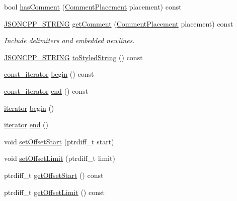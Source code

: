 \begin{DoxyCompactItemize}
bool \hyperlink{classJson_1_1Value_a06567a00363cab9601be7e31336db03a}{has\+Comment} (\hyperlink{namespaceJson_a4fc417c23905b2ae9e2c47d197a45351}{Comment\+Placement} placement) const 
\item 
\hyperlink{json_8hpp_a1e723f95759de062585bc4a8fd3fa4be}{J\+S\+O\+N\+C\+P\+P\+\_\+\+S\+T\+R\+I\+NG} \hyperlink{classJson_1_1Value_a5c3d0767cddbcba71a41bf52ead10525}{get\+Comment} (\hyperlink{namespaceJson_a4fc417c23905b2ae9e2c47d197a45351}{Comment\+Placement} placement) const 
\begin{DoxyCompactList}\small\item\em Include delimiters and embedded newlines. \end{DoxyCompactList}\item 
\hyperlink{json_8hpp_a1e723f95759de062585bc4a8fd3fa4be}{J\+S\+O\+N\+C\+P\+P\+\_\+\+S\+T\+R\+I\+NG} \hyperlink{classJson_1_1Value_a1b893476675b8f1c83f6f60a0938089b}{to\+Styled\+String} () const 
\item 
\hyperlink{classJson_1_1Value_af92282ca92b58b320debd486afb7696a}{const\+\_\+iterator} \hyperlink{classJson_1_1Value_ac12df0d6980600c5bac908ed0f64856e}{begin} () const 
\item 
\hyperlink{classJson_1_1Value_af92282ca92b58b320debd486afb7696a}{const\+\_\+iterator} \hyperlink{classJson_1_1Value_a596da1926b2f2a4056bff2edb713eb0b}{end} () const 
\item 
\hyperlink{classJson_1_1Value_a341cdf2e01f8b3c5b7317aa2f0768c53}{iterator} \hyperlink{classJson_1_1Value_a2d45bb2e68e8f22fe356d7d955ebd3c9}{begin} ()
\item 
\hyperlink{classJson_1_1Value_a341cdf2e01f8b3c5b7317aa2f0768c53}{iterator} \hyperlink{classJson_1_1Value_a2f961eff73f7f79cd29260b6cbd42558}{end} ()
\item 
void \hyperlink{classJson_1_1Value_a92e32ea0f4f8a15853a3cf0beac9feb9}{set\+Offset\+Start} (ptrdiff\+\_\+t start)
\item 
void \hyperlink{classJson_1_1Value_a5e4f5853fec138150c5df6004a8c2bcf}{set\+Offset\+Limit} (ptrdiff\+\_\+t limit)
\item 
ptrdiff\+\_\+t \hyperlink{classJson_1_1Value_a9db4cb1a48c3c0ff41332c259e8acf20}{get\+Offset\+Start} () const 
\item 
ptrdiff\+\_\+t \hyperlink{classJson_1_1Value_a4f92b010664f61ec5eea8ca3f31b149b}{get\+Offset\+Limit} () const 
\end{DoxyCompactItemize}
